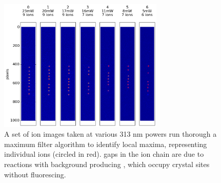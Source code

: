 \begin{figure}
	\centering
	\includegraphics[width=0.7\textwidth]{images/ion_images.png}
	\caption{A set of ion images taken at various 313 nm powers run thorough a maximum filter algorithm to identify local maxima, representing individual ions (circled in red). gaps in the ion chain are due to reactions with background  producing , which occupy crystal sites without fluorescing.}
	\label{fig: ion image set}
\end{figure}

